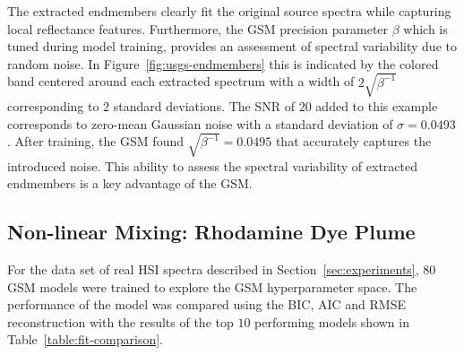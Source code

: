 The extracted endmembers clearly fit the original source spectra while capturing
local reflectance features. Furthermore, the GSM precision parameter $\beta$
which is tuned during model training, provides an assessment of spectral
variability due to random noise. In Figure~\ref{fig:usgs-endmembers} this is
indicated by the colored band centered around each extracted spectrum with a
width of $2\sqrt{\beta^{-1}}$ corresponding to 2 standard deviations. The SNR of
$20$ added to this example corresponds to zero-mean Gaussian noise with a
standard deviation of $\sigma=0.0493$. After training, the GSM found
$\sqrt{\beta^{-1}}=0.0495$ that accurately captures the introduced noise. This
ability to assess the spectral variability of extracted endmembers is a key
advantage of the GSM.


\subsection{Non-linear Mixing: Rhodamine Dye Plume}

For the data set of real HSI spectra described in Section~\ref{sec:experiments},
80 GSM models were trained to explore the GSM hyperparameter space. The
performance of the model was compared using the BIC, AIC and RMSE reconstruction
with the results of the top $10$ performing models shown in
Table~\ref{table:fit-comparison}.

